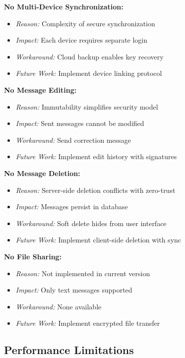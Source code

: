 \textbf{No Multi-Device Synchronization:}
\begin{itemize}
    \item \textit{Reason:} Complexity of secure synchronization
    \item \textit{Impact:} Each device requires separate login
    \item \textit{Workaround:} Cloud backup enables key recovery
    \item \textit{Future Work:} Implement device linking protocol
\end{itemize}

\textbf{No Message Editing:}
\begin{itemize}
    \item \textit{Reason:} Immutability simplifies security model
    \item \textit{Impact:} Sent messages cannot be modified
    \item \textit{Workaround:} Send correction message
    \item \textit{Future Work:} Implement edit history with signatures
\end{itemize}

\textbf{No Message Deletion:}
\begin{itemize}
    \item \textit{Reason:} Server-side deletion conflicts with zero-trust
    \item \textit{Impact:} Messages persist in database
    \item \textit{Workaround:} Soft delete hides from user interface
    \item \textit{Future Work:} Implement client-side deletion with sync
\end{itemize}

\textbf{No File Sharing:}
\begin{itemize}
    \item \textit{Reason:} Not implemented in current version
    \item \textit{Impact:} Only text messages supported
    \item \textit{Workaround:} None available
    \item \textit{Future Work:} Implement encrypted file transfer
\end{itemize}

\subsection{Performance Limitations}

